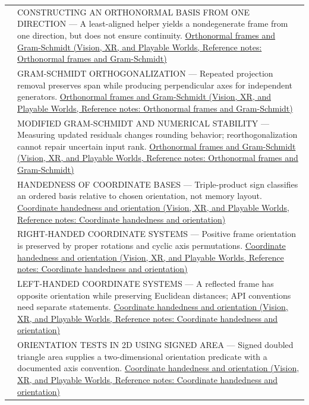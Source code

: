 {\begin{longtable}[]{@{}
  >{\raggedright\arraybackslash}p{}
  >{\raggedright\arraybackslash}p{}@{}}
560 & CONSTRUCTING AN ORTHONORMAL BASIS FROM ONE DIRECTION --- A least-aligned helper yields a nondegenerate frame from one direction, but does not ensure continuity. \href{../07-Vision-XR-and-Playable-Worlds/main.pdf\#nameddest=appendix-c39f1ed34271}{Orthonormal frames and Gram-Schmidt (Vision, XR, and Playable Worlds, Reference notes: Orthonormal frames and Gram-Schmidt)} \\
561 & GRAM-SCHMIDT ORTHOGONALIZATION --- Repeated projection removal preserves span while producing perpendicular axes for independent generators. \href{../07-Vision-XR-and-Playable-Worlds/main.pdf\#nameddest=appendix-c39f1ed34271}{Orthonormal frames and Gram-Schmidt (Vision, XR, and Playable Worlds, Reference notes: Orthonormal frames and Gram-Schmidt)} \\
562 & MODIFIED GRAM-SCHMIDT AND NUMERICAL STABILITY --- Measuring updated residuals changes rounding behavior; reorthogonalization cannot repair uncertain input rank. \href{../07-Vision-XR-and-Playable-Worlds/main.pdf\#nameddest=appendix-c39f1ed34271}{Orthonormal frames and Gram-Schmidt (Vision, XR, and Playable Worlds, Reference notes: Orthonormal frames and Gram-Schmidt)} \\
563 & HANDEDNESS OF COORDINATE BASES --- Triple-product sign classifies an ordered basis relative to chosen orientation, not memory layout. \href{../07-Vision-XR-and-Playable-Worlds/main.pdf\#nameddest=appendix-87d7626c8d37}{Coordinate handedness and orientation (Vision, XR, and Playable Worlds, Reference notes: Coordinate handedness and orientation)} \\
564 & RIGHT-HANDED COORDINATE SYSTEMS --- Positive frame orientation is preserved by proper rotations and cyclic axis permutations. \href{../07-Vision-XR-and-Playable-Worlds/main.pdf\#nameddest=appendix-87d7626c8d37}{Coordinate handedness and orientation (Vision, XR, and Playable Worlds, Reference notes: Coordinate handedness and orientation)} \\
565 & LEFT-HANDED COORDINATE SYSTEMS --- A reflected frame has opposite orientation while preserving Euclidean distances; API conventions need separate statements. \href{../07-Vision-XR-and-Playable-Worlds/main.pdf\#nameddest=appendix-87d7626c8d37}{Coordinate handedness and orientation (Vision, XR, and Playable Worlds, Reference notes: Coordinate handedness and orientation)} \\
566 & ORIENTATION TESTS IN 2D USING SIGNED AREA --- Signed doubled triangle area supplies a two-dimensional orientation predicate with a documented axis convention. \href{../07-Vision-XR-and-Playable-Worlds/main.pdf\#nameddest=appendix-87d7626c8d37}{Coordinate handedness and orientation (Vision, XR, and Playable Worlds, Reference notes: Coordinate handedness and orientation)} \\

\end{longtable}}
